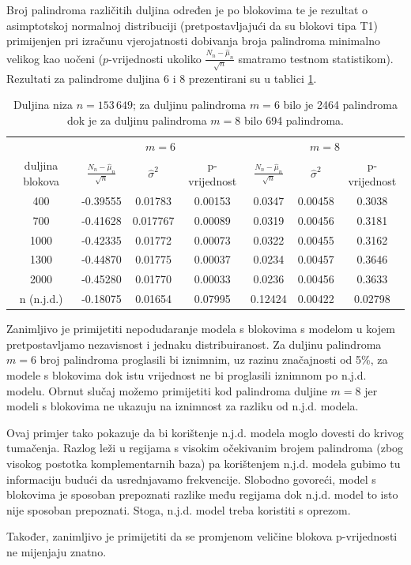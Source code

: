 \noindent  
Broj palindroma različitih duljina određen je po blokovima
te je rezultat o asimptotskoj normalnoj distribuciji
(pretpostavljajući da su blokovi tipa T1)
primijenjen pri izračunu vjerojatnosti dobivanja
broja palindroma minimalno velikog kao uočeni
($p$-vrijednosti ukoliko $\frac{N_n-\hat{\mu}_n}{\sqrt{n}}$
smatramo testnom statistikom). Rezultati za
palindrome duljina $6$ i $8$ prezentirani su u tablici
\ref{pal:tab:rezultatinahomosapiensu}. 

\begin{table}[htbp] 
\caption{Duljina niza $n=153\, 649$; za duljinu palindroma $m=6$
	bilo je 2464 palindroma dok je za duljinu palindroma $m=8$
	bilo 694 palindroma.}
\label{pal:tab:rezultatinahomosapiensu}
\centering
\begin{tabular}{ccccccc}
\hline
\multicolumn{1}{c}{} & \multicolumn{3}{c}{$m=6$} & \multicolumn{3}{c}{$m=8$} \\
\cmidrule(lr{0.75em}){2-4} \cmidrule(lr{0.75em}){5-7}
duljina blokova & $\frac{N_n-\hat{\mu}_n}{\sqrt{n}}$ & $\hat{\sigma}^2$ & p-vrijednost
& $\frac{N_n-\hat{\mu}_n}{\sqrt{n}}$ & $\hat{\sigma}^2$ & p-vrijednost \\
\hline
400 & -0.39555 & 0.01783 & 0.00153 & 0.0347 & 0.00458 & 0.3038\\ 
700 & -0.41628 & 0.017767 & 0.00089 & 0.0319 & 0.00456 & 0.3181\\ 
1000 & -0.42335  & 0.01772 & 0.00073 & 0.0322 & 0.00455 & 0.3162\\ 
1300 & -0.44870 & 0.01775 & 0.00037  & 0.0234 & 0.00457 & 0.3646\\ 
2000 & -0.45280 & 0.01770 & 0.00033  & 0.0236 & 0.00456 & 0.3633\\ 
n (n.j.d.) & -0.18075 & 0.01654 & 0.07995 & 0.12424  & 0.00422 & 0.02798\\ 
\hline 
\end{tabular} 
\end{table}

\noindent
Zanimljivo je primijetiti nepodudaranje modela s blokovima
s modelom u kojem pretpostavljamo nezavisnost i jednaku
distribuiranost. Za duljinu palindroma $m=6$ broj 
palindroma proglasili bi iznimnim, uz razinu značajnosti
od 5\%, za modele s blokovima dok istu vrijednost ne bi
proglasili iznimnom po n.j.d. modelu.
Obrnut slučaj možemo primijetiti kod palindroma duljine $m=8$
jer modeli s blokovima ne ukazuju na iznimnost za razliku od
n.j.d. modela.

Ovaj primjer tako pokazuje da bi korištenje n.j.d. modela moglo
dovesti do krivog tumačenja. Razlog leži u regijama s visokim
očekivanim brojem palindroma (zbog visokog postotka
komplementarnih baza) pa korištenjem n.j.d. modela
gubimo tu informaciju budući da usrednjavamo frekvencije.
Slobodno govoreći, model s blokovima je sposoban prepoznati
razlike među regijama dok n.j.d. model to isto nije sposoban
prepoznati. Stoga, n.j.d. model treba koristiti s oprezom.

Također, zanimljivo je primijetiti da se promjenom veličine
blokova p-vrijednosti ne mijenjaju znatno.

